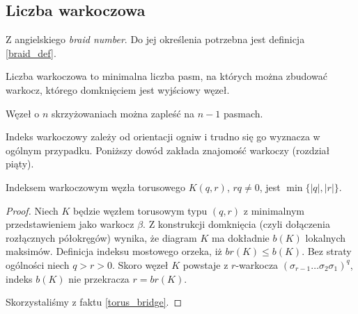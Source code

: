 
\subsection{Liczba warkoczowa} %
\label{sub:braid_number}
Z angielskiego \emph{braid number}.
Do jej określenia potrzebna jest definicja \ref{braid_def}.

\begin{definition}
    Liczba warkoczowa to minimalna liczba pasm, na których można zbudować warkocz, którego domknięciem jest wyjściowy węzeł.
\end{definition}

\begin{proposition}
    Węzeł o $n$ skrzyżowaniach można zapleść na $n - 1$ pasmach.
\end{proposition}

Indeks warkoczowy zależy od orientacji ogniw i trudno się go wyznacza w ogólnym przypadku.
Poniższy dowód zakłada znajomość warkoczy (rozdział piąty).

\begin{proposition}
    Indeksem warkoczowym węzła torusowego $K(q, r)$, $rq \neq 0$, jest $\min\{|q|, |r|\}$.
\end{proposition}

\begin{proof}
    Niech $K$ będzie węzłem torusowym typu $(q,r)$ z minimalnym przedstawieniem jako warkocz $\beta$.
    Z konstrukcji domknięcia (czyli dołączenia rozłącznych półokręgów) wynika,
    że diagram $K$ ma dokładnie $b(K)$ lokalnych maksimów.
    Definicja indeksu mostowego orzeka, iż $br(K) \le b(K)$.
    Bez straty ogólności niech $q > r > 0$.
    Skoro węzeł $K$ powstaje z $r$-warkocza $(\sigma_{r-1} \ldots \sigma_2\sigma_1)^q$,
    indeks $b(K)$ nie przekracza $r = br(K)$.

    Skorzystaliśmy z faktu \ref{torus_bridge}.
\end{proof}


